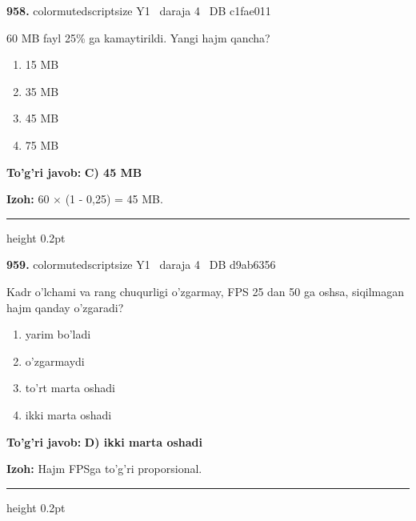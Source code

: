\documentclass[10pt,a4paper,oneside]{article}
\begin{document}
\noindent\textbf{\color{ink}958.}  {color{muted}scriptsize Y1 \textbullet\ daraja 4 \textbullet\ DB c1fae011}
\par
60 MB fayl 25\% ga kamaytirildi. Yangi hajm qancha?
\begin{enumerate}[label=\Alph*),leftmargin=9mm]
\item 15 MB
\item 35 MB
\item 45 MB
\item 75 MB
\end{enumerate}
\begin{tcolorbox}[enhanced,breakable,colback=teal!4,colframe=teal!50!black,boxrule=0.5pt,arc=1.1mm,left=3mm,right=3mm,top=1.7mm,bottom=1.7mm,before skip=2mm,after skip=2mm]
\textbf{\color{teal}To'g'ri javob:} \textbf{C) 45 MB}
\par\smallskip
\textbf{Izoh:} 60 \ensuremath{\times} (1 - 0,25) = 45 MB.
\end{tcolorbox}
\vspace{2mm}\hrule height 0.2pt \vspace{3mm}

\noindent\textbf{\color{ink}959.}  {color{muted}scriptsize Y1 \textbullet\ daraja 4 \textbullet\ DB d9ab6356}
\par
Kadr o'lchami va rang chuqurligi o'zgarmay, FPS 25 dan 50 ga oshsa, siqilmagan hajm qanday o'zgaradi?
\begin{enumerate}[label=\Alph*),leftmargin=9mm]
\item yarim bo'ladi
\item o'zgarmaydi
\item to'rt marta oshadi
\item ikki marta oshadi
\end{enumerate}
\begin{tcolorbox}[enhanced,breakable,colback=teal!4,colframe=teal!50!black,boxrule=0.5pt,arc=1.1mm,left=3mm,right=3mm,top=1.7mm,bottom=1.7mm,before skip=2mm,after skip=2mm]
\textbf{\color{teal}To'g'ri javob:} \textbf{D) ikki marta oshadi}
\par\smallskip
\textbf{Izoh:} Hajm FPSga to'g'ri proporsional.
\end{tcolorbox}
\vspace{2mm}\hrule height 0.2pt \vspace{3mm}
\end{document}
